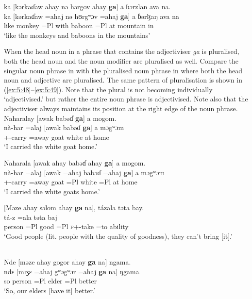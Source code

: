 \medskip
 ka [kərkaɗaw ahay nə hərgov ahay \textbf{ga}] a  ɓərzlan ava na.\\
\gll ka  [kərkaɗaw  =ahaj    nə   hʊrgʷɔv   =ahaj  \textbf{ga}]    a      ɓərɮaŋ     ava    na\\
      like  monkey      =Pl        with    baboon    =Pl  {\ADJ}  at    mountain    in    {\PSP}\\
\glt  ‘like the monkeys and baboons in the mountains’
\z

When the head noun in a phrase that contains the adjectiviser \textit{ga} is pluralised, both the head noun and the noun modifier are pluralised as well. Compare the singular noun phrase in  with the pluralised noun phrase in  where both the head noun and adjective are pluralised. %
The same pattern of pluralisation is shown in (\ref{ex:5:48}--\ref{ex:5:49}). Note that the plural is not becoming individually ‘adjectivised.’ but rather the entire noun phrase is adjectivised. Note also that the adjectiviser always maintains its position at the right edge of the noun phrase. 
\clearpage
\ea \label{ex:5:46}
Naharalay  [awak  babəɗ \textbf{ga}]  a  mogom.\\
\gll  nà-har     =alaj    [awak    babəɗ    \textbf{ga}]  a  mɔgʷɔm\\
      {\oneS}+{\PFV}-carry =away    goat    white    {\ADJ}  at  home\\
\glt  ‘I carried the white goat home.’
\z

\ea \label{ex:5:47}
Naharala  [awak  ahay  babəɗ  ahay  \textbf{ga}]  a  mogom.\\
\gll  nà-har     =alaj    [awak  =ahaj  babəɗ  =ahaj  \textbf{ga}]  a  mɔgʷɔm\\
      {\oneS}+{\PFV}-carry =away    goat  =Pl  white  =Pl  {\ADJ}  at  home\\
\glt  ‘I carried the white goats home.’
\z

\ea \label{ex:5:48}
 [Məze  ahay  səlom  ahay  \textbf{ga}   na], tázala  təta  bay.\\
\gll  [mɪʒɛ  =ahaj   sʊlɔm   =ahaj   \textbf{ga}   na]   tá-z =ala  təta     baj\\
      person     =Pl     good    =Pl   {\ADJ}   {\PSP}  \textsc{p}+{\IFV}-take =to  ability  {\NEG}\\
\glt  ‘Good people (lit. people with the quality of goodness), they can’t bring [it].' 
\z


\ea \label{ex:5:49}\\
Nde  [məze  ahay  gogor  ahay  \textbf{ga}   na]  ngama.\\
\gll  ndɛ  [mɪʒɛ  =ahaj  gʷɔgʷɔr     =ahaj   \textbf{ga}  na]   ŋgama\\
      so    person     =Pl  elder     =Pl   {\ADJ}   {\PSP}  better\\
\glt  ‘So, our elders [have it] better.'
\z

